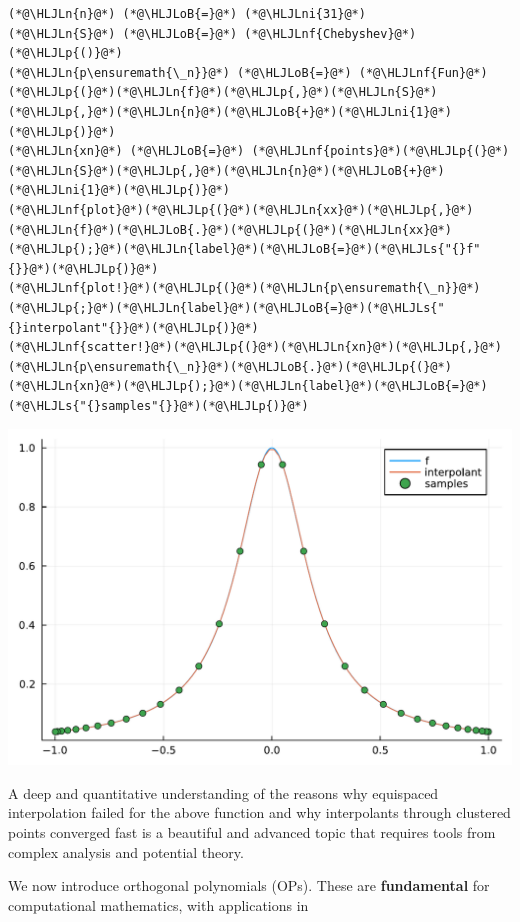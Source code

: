 \documentclass[12pt,a4paper]{article}
\newcommand{\HLJLn}[1]{#1}
\newcommand{\HLJLnf}[1]{\textcolor[RGB]{66,102,213}{#1}}
\newcommand{\HLJLs}[1]{\textcolor[RGB]{201,61,57}{#1}}
\newcommand{\HLJLni}[1]{\textcolor[RGB]{59,151,46}{#1}}
\newcommand{\HLJLoB}[1]{\textcolor[RGB]{102,102,102}{\textbf{#1}}}
\newcommand{\HLJLp}[1]{#1}
\begin{document}
\begin{lstlisting}
(*@\HLJLn{n}@*) (*@\HLJLoB{=}@*) (*@\HLJLni{31}@*)
(*@\HLJLn{S}@*) (*@\HLJLoB{=}@*) (*@\HLJLnf{Chebyshev}@*)(*@\HLJLp{()}@*)
(*@\HLJLn{p\ensuremath{\_n}}@*) (*@\HLJLoB{=}@*) (*@\HLJLnf{Fun}@*)(*@\HLJLp{(}@*)(*@\HLJLn{f}@*)(*@\HLJLp{,}@*)(*@\HLJLn{S}@*)(*@\HLJLp{,}@*)(*@\HLJLn{n}@*)(*@\HLJLoB{+}@*)(*@\HLJLni{1}@*)(*@\HLJLp{)}@*) 
(*@\HLJLn{xn}@*) (*@\HLJLoB{=}@*) (*@\HLJLnf{points}@*)(*@\HLJLp{(}@*)(*@\HLJLn{S}@*)(*@\HLJLp{,}@*)(*@\HLJLn{n}@*)(*@\HLJLoB{+}@*)(*@\HLJLni{1}@*)(*@\HLJLp{)}@*) 
(*@\HLJLnf{plot}@*)(*@\HLJLp{(}@*)(*@\HLJLn{xx}@*)(*@\HLJLp{,}@*)(*@\HLJLn{f}@*)(*@\HLJLoB{.}@*)(*@\HLJLp{(}@*)(*@\HLJLn{xx}@*)(*@\HLJLp{);}@*)(*@\HLJLn{label}@*)(*@\HLJLoB{=}@*)(*@\HLJLs{"{}f"{}}@*)(*@\HLJLp{)}@*)
(*@\HLJLnf{plot!}@*)(*@\HLJLp{(}@*)(*@\HLJLn{p\ensuremath{\_n}}@*)(*@\HLJLp{;}@*)(*@\HLJLn{label}@*)(*@\HLJLoB{=}@*)(*@\HLJLs{"{}interpolant"{}}@*)(*@\HLJLp{)}@*)
(*@\HLJLnf{scatter!}@*)(*@\HLJLp{(}@*)(*@\HLJLn{xn}@*)(*@\HLJLp{,}@*)(*@\HLJLn{p\ensuremath{\_n}}@*)(*@\HLJLoB{.}@*)(*@\HLJLp{(}@*)(*@\HLJLn{xn}@*)(*@\HLJLp{);}@*)(*@\HLJLn{label}@*)(*@\HLJLoB{=}@*)(*@\HLJLs{"{}samples"{}}@*)(*@\HLJLp{)}@*)
\end{lstlisting}

\includegraphics[width=\linewidth]{jl_hpkPoK/OP_methods_test_6_1.pdf}

A deep and quantitative understanding of the reasons why equispaced interpolation failed for the above function and why interpolants through clustered points converged fast is a beautiful and advanced topic that requires tools from complex analysis and potential theory.

We now introduce orthogonal polynomials (OPs). These are \textbf{fundamental} for computational mathematics, with applications in
\end{document}
